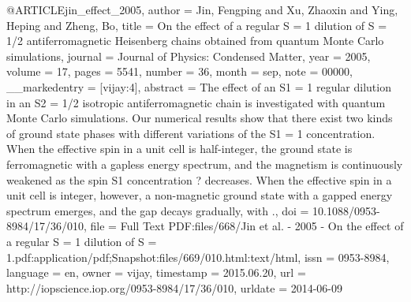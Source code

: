 @ARTICLE{jin_effect_2005,
  author = {Jin, Fengping and Xu, Zhaoxin and Ying, Heping and Zheng, Bo},
  title = {On the effect of a regular {S} = 1 dilution of {S} = 1/2 antiferromagnetic
	{Heisenberg} chains obtained from quantum {Monte} {Carlo} simulations},
  journal = {Journal of Physics: Condensed Matter},
  year = {2005},
  volume = {17},
  pages = {5541},
  number = {36},
  month = sep,
  note = {00000},
  __markedentry = {[vijay:4]},
  abstract = {The effect of an S1 = 1 regular dilution in an S2 = 1/2 isotropic
	antiferromagnetic chain is investigated with quantum Monte Carlo
	simulations. Our numerical results show that there exist two kinds
	of ground state phases with different variations of the S1 = 1 concentration.
	When the effective spin in a unit cell is half-integer, the ground
	state is ferromagnetic with a gapless energy spectrum, and the magnetism
	is continuously weakened as the spin S1 concentration ? decreases.
	When the effective spin in a unit cell is integer, however, a non-magnetic
	ground state with a gapped energy spectrum emerges, and the gap decays
	gradually, with .},
  doi = {10.1088/0953-8984/17/36/010},
  file = {Full Text PDF:files/668/Jin et al. - 2005 - On the effect of a regular S = 1 dilution of S = 1.pdf:application/pdf;Snapshot:files/669/010.html:text/html},
  issn = {0953-8984},
  language = {en},
  owner = {vijay},
  timestamp = {2015.06.20},
  url = {http://iopscience.iop.org/0953-8984/17/36/010},
  urldate = {2014-06-09}
}

